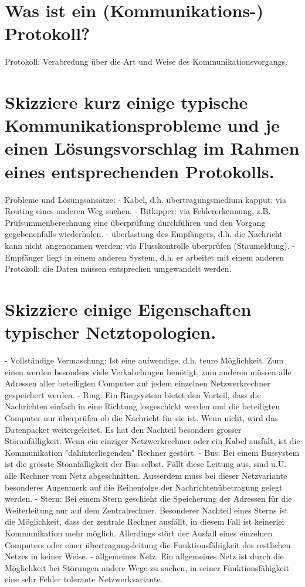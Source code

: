 \documentclass[12pt,a4paper,ngerman]{scrartcl}
\newcommand{\question}[1]{#1}
\newenvironment {answer}
                {}
                {}
\begin{document}
\section{\question{Was ist ein (Kommunikations-) Protokoll?}}
\begin{answer}
Protokoll: Verabredung über die Art und Weise des Kommunikationsvorgangs.
\end{answer}

\section{\question{Skizziere kurz einige typische Kommunikationsprobleme und je einen Lösungsvorschlag im Rahmen eines entsprechenden Protokolls.}}
\begin{answer}
Probleme und Lösungsansätze:
- Kabel, d.h. übertragungsmedium kapput: via Routing eines anderen Weg suchen.
- Bitkipper: via Fehlererkennung, z.B. Prüfsummenberechnung eine überprüfung durchführen und
den Vorgang gegebenenfalls wiederholen.
- überlastung des Empfängers, d.h. die Nachricht kann nicht angenommen werden: via Flusskontrolle
überprüfen (Staumeldung).
- Empfänger liegt in einem anderen System, d.h. er arbeitet mit einem anderen Protokoll: die
Daten müssen entsprechen umgewandelt werden.
\end{answer}

\section{\question{Skizziere einige Eigenschaften typischer Netztopologien.}}
\begin{answer}
- Vollständige Vermaschung:
Ist eine aufwendige, d.h. teure Möglichkeit. Zum einen werden besonders viele Verkabelungen
benötigt, zum anderen müssen alle Adressen aller beteiligten Computer auf jedem einzelnen Netzwerkrechner
gespeichert werden.
- Ring:
Ein Ringsystem bietet den Vorteil, dass die Nachrichten einfach in eine Richtung losgeschickt
werden und die beteiligten Computer nur überprüfen ob die Nachricht für sie ist. Wenn nicht,
wird das Datenpacket weitergeleitet.
Es hat den Nachteil besonders grosser Störanfälligkeit. Wenn ein einziger Netzwerkrechner oder
ein Kabel ausfält, ist die Kommunikation "dahinterliegenden" Rechner gestört.
- Bus:
Bei einem Bussystem ist die grösste Stöanfälligkeit der Bus selbst. Fällt diese Leitung aus, sind
u.U. alle Rechner vom Netz abgeschnitten. Ausserdem muss bei dieser Netzvariante besonderes
Augenmerk auf die Reihenfolge der Nachrichtenübetragung gelegt werden.
- Stern:
Bei einem Stern geschieht die Speicherung der Adressen für die Weiterleitung nur auf dem Zentralrechner.
Besonderer Nachteil eines Sterns ist die Möglichkeit, dass der zentrale Rechner ausfällt, in
diesem Fall ist keinerlei Kommunikation mehr möglich. Allerdings stört der Ausfall eines einzelnen
Computers oder einer übertragungsleitung die Funktionsfähigkeit des restlichen Netzes in keiner
Weise.
- allgemeines Netz:
Ein allgemeines Netz ist durch die Möglichkeit bei Störungen andere Wege zu suchen, in seiner
Funktionsfähigkeit eine sehr Fehler tolerante Netzwerkvariante.
\end{answer}
\end{document}
